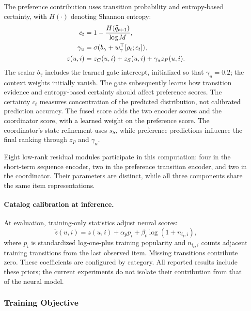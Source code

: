 \documentclass[11pt]{article}
\begin{document}
The preference contribution uses transition probability and entropy-based certainty, with $H(\cdot)$ denoting Shannon entropy:
\begin{align}
 c_t&=1-\frac{H(\widehat q_{t+1})}{\log M},\notag\\
 \gamma_u&=\sigma(b_\gamma+w_\gamma^\top[\rho_t;c_t]),\notag\\
 z(u,i)&=z_C(u,i)+z_S(u,i)+\gamma_u z_P(u,i).
\end{align}
The scalar $b_\gamma$ includes the learned gate intercept, initialized so that $\gamma_u=0.2$; the context weights initially vanish. The gate subsequently learns how transition evidence and entropy-based certainty should affect preference scores. The certainty $c_t$ measures concentration of the predicted distribution, not calibrated prediction accuracy. The fused score adds the two encoder scores and the coordinator score, with a learned weight on the preference score. The coordinator's state refinement uses $s_S$, while preference predictions influence the final ranking through $z_P$ and $\gamma_u$.

Eight low-rank residual modules participate in this computation: four in the short-term sequence encoder, two in the preference transition encoder, and two in the coordinator. Their parameters are distinct, while all three components share the same item representations.

\paragraph{Catalog calibration at inference.}
At evaluation, training-only statistics adjust neural scores:
\begin{equation}
 \widetilde z(u,i)=z(u,i)+\alpha_p p_i+\beta_t\log(1+n_{i_t,i}),
\end{equation}
where $p_i$ is standardized log-one-plus training popularity and $n_{i_t,i}$ counts adjacent training transitions from the last observed item. Missing transitions contribute zero. These coefficients are configured by category. All reported results include these priors; the current experiments do not isolate their contribution from that of the neural model.

\subsubsection{Training Objective}
\end{document}
